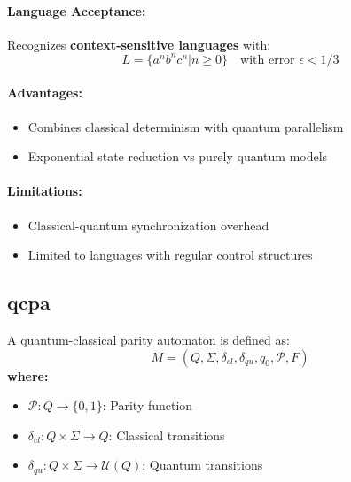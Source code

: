 \paragraph{Language Acceptance:}
Recognizes \textbf{context-sensitive languages} with:
\[
L = \{a^nb^nc^n | n \geq 0\} \quad \text{with error } \epsilon < 1/3 
\]
\cite{zheng2015power}

\paragraph{Advantages:}
\begin{itemize}
    \item Combines classical determinism with quantum parallelism
    \item Exponential state reduction vs purely quantum models
\end{itemize}

\paragraph{Limitations:}
\begin{itemize}
    \item Classical-quantum synchronization overhead
    \item Limited to languages with regular control structures
\end{itemize}

\subsection{\acrfull{qcpa}}
\label{subsec:qcpa}

\begin{definition}
A quantum-classical parity automaton is defined as:
\[
M = (Q, \Sigma, \delta_{cl}, \delta_{qu}, q_0, \mathcal{P}, F)
\]
\textbf{where:}
\begin{itemize}
    \item $\mathcal{P}: Q \rightarrow \{0,1\}$: Parity function
    \item $\delta_{cl}: Q \times \Sigma \rightarrow Q$: Classical transitions
    \item $\delta_{qu}: Q \times \Sigma \rightarrow \mathcal{U}(Q)$: Quantum transitions
\end{itemize}
\end{definition}


